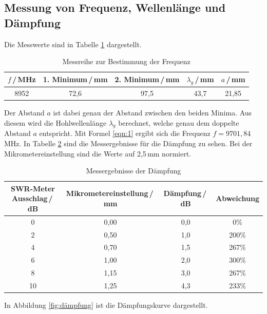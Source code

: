 \subsection{Messung von Frequenz, Wellenlänge und Dämpfung}
Die Messwerte sind in Tabelle \ref{tab:frequenz} dargestellt.
\begin{table}
    \centering
    \begin{tabular}{c c c c c}
        \toprule
        {$f$\,/\,MHz} & {1. Minimum\,/\,mm} & {2. Minimum\,/\,mm} & {$\lambda_g$\,/\,mm} & {$a$\,/\,mm}\\
        \midrule
        8952 & 72,6 & 97,5 & 43,7 & 21,85\\
        \bottomrule
    \end{tabular}
    \caption{Messreihe zur Bestimmung der Frequenz}
    \label{tab:frequenz}
\end{table}
\newline
Der Abstand $a$ ist dabei genau der Abstand zwischen den beiden Minima.
Aus diesem wird die Hohlwellenlänge $\lambda_g$ berechnet, welche genau dem doppelte Abstand $a$ entspricht.
\newline
Mit Formel \ref{eqn:1} ergibt sich die Frequenz $f = 9701,84$\,MHz.
\newline
In Tabelle \ref{tab:swr} sind die Messergebnisse für die Dämpfung zu sehen.
Bei der Mikrometereinstellung sind die Werte auf 2,5\,mm normiert.
\begin{table}
    \centering
    \begin{tabular}{c c c c}
        \toprule
        {SWR-Meter Ausschlag\,/\,dB} & {Mikrometereinstellung\,/\,mm} & {Dämpfung\,/\,dB} & {Abweichung}\\
        \midrule
         0 & 0,00 & 0,0 & 0\% \\
         2 & 0,50 & 1,0 & 200\% \\
         4 & 0,70 & 1,5 & 267\% \\
         6 & 1,00 & 2,0 & 300\% \\
         8 & 1,15 & 3,0 & 267\%\\
         10 & 1,25 & 4,3 & 233\%\\
        \bottomrule
    \end{tabular}
    \caption{Messergebnisse der Dämpfung}
    \label{tab:swr}
\end{table}
\newline
In Abbildung \ref{fig:dämpfung} ist die Dämpfungskurve dargestellt.
